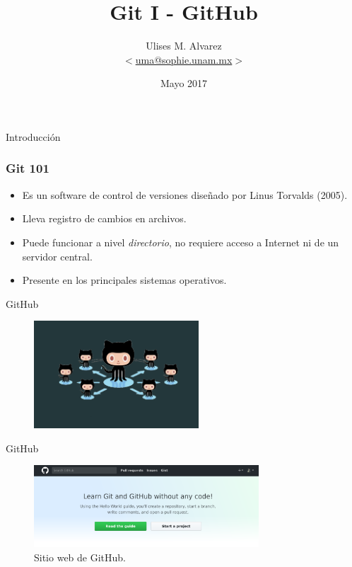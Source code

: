 \documentclass{beamer}
\title{Git I - GitHub}
\date{Mayo 2017}
\author{Ulises M. Alvarez\\ %
   $<$\href{mailto:uma@sophie.unam.mx}%
   {uma@sophie.unam.mx}$>$
}
\institute{Sophie UNAM}
\begin{document}
\maketitle



\begin{frame}[standout]
  Introducción
\end{frame}

\begin{frame}
  \frametitle{Git 101}
  \begin{itemize}
  \item Es un software de control de versiones diseñado por Linus
    Torvalds (2005).
  \item Lleva registro de cambios en archivos.
  \item Puede funcionar a nivel \textit{directorio}, no requiere
    acceso a Internet ni de un servidor central.
  \item Presente en los principales sistemas operativos.
  \end{itemize}
\end{frame}

\begin{frame}[standout]
  GitHub
  \begin{figure}[b]
    \centering
    \includegraphics[width=0.55\textwidth]{fig/gitSocial}
  \end{figure}
\end{frame}

\begin{frame}{GitHub}
  \begin{figure}[hp]
    \centering \includegraphics[width=0.75\textwidth]{fig/00start}
    \caption{Sitio web de GitHub.}
    \label{fig:githw}
  \end{figure}
\end{frame}
\end{document}
